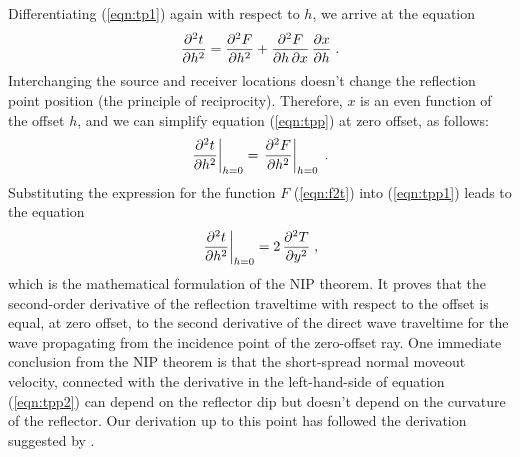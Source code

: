Differentiating (\ref{eqn:tp1}) again with respect to $h$, we arrive at the
equation 
\begin{equation}
{{\partial^2 t} \over {\partial h^2}} = 
{{\partial^2 F} \over {\partial h^2}} +
{{\partial^2 F} \over {\partial h\,\partial x}}\,
{{\partial x} \over {\partial h}}\;.
\label{eqn:tpp}
\end{equation}
Interchanging the source and receiver locations doesn't change the
reflection point position (the principle of reciprocity). Therefore,
$x$ is an even function of the offset $h$, and we can simplify equation
(\ref{eqn:tpp}) at zero offset, as follows:
\begin{equation}
\left.{{\partial^2 t} \over {\partial h^2}}\right|_{h=0} = 
\left.{{\partial^2 F} \over {\partial h^2}}\right|_{h=0}\;.
\label{eqn:tpp1}
\end{equation}
Substituting the expression for the function $F$ (\ref{eqn:f2t}) into
(\ref{eqn:tpp1}) leads to the equation
\begin{equation}
\left.{{\partial^2 t} \over {\partial h^2}}\right|_{h=0} = 
2\,{{\partial^2 T} \over {\partial y^2}}\;,
\label{eqn:tpp2}
\end{equation}
which is the mathematical formulation of the NIP theorem. It proves
that the second-order derivative of the reflection traveltime with
respect to the offset is equal, at zero offset, to the second
derivative of the direct wave traveltime for the wave propagating from
the incidence point of the zero-offset ray. One immediate conclusion
from the NIP theorem is that the short-spread normal moveout velocity,
connected with the derivative in the left-hand-side of equation
(\ref{eqn:tpp2}) can depend on the reflector dip but doesn't depend on
the curvature of the reflector. Our derivation up to this point has
followed the derivation suggested by \cite{chergr}.


